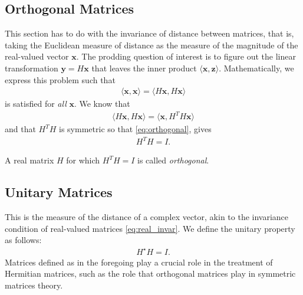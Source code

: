 \subsection{Orthogonal Matrices}
%
This section has to do with the invariance of distance between matrices, that is, taking the Euclidean measure of distance as the measure of the magnitude of the real-valued vector $\bm{x}$. The prodding question of interest is to figure out the linear transformation $\bm{y} = H \bm{x}$ that leaves the inner product $\langle\bm{x}, \bm{z}\rangle$. Mathematically, we express this problem such that 
%
\begin{align}
	\langle \bm{x}, \bm{x}\rangle = \langle H\bm{x}, H \bm{x} \rangle 
	\label{eq:orthogonal}
\end{align}
%
is satisfied for \textit{all} $\bm{x}$. We know that  
%
\begin{align}
	\langle H \bm{x}, H \bm{x}\rangle = \langle \bm{x}, H^T H \bm{x}\rangle
\end{align}
%
and that $H^TH$ is symmetric so that  \eqref{eq:orthogonal}, gives 
%
\begin{align}
	H^TH = I.
	\label{eq:real_invar}
\end{align}
%
\begin{tcolorbox}[title=Orthogonal Matrix]
	A real matrix $H$ for which $H^TH=I$ is called \textit{orthogonal}.
\end{tcolorbox}

\subsection{Unitary Matrices}

This is the measure of the distance of a complex vector, akin to the invariance condition of real-valued matrices \eqref{eq:real_invar}. We define the unitary property as follows:
%
\begin{align}
	H^\star H = I.
\end{align}
%
Matrices defined as in the foregoing play a crucial role in the treatment of Hermitian matrices, such as the role that orthogonal matrices play in symmetric matrices theory.

